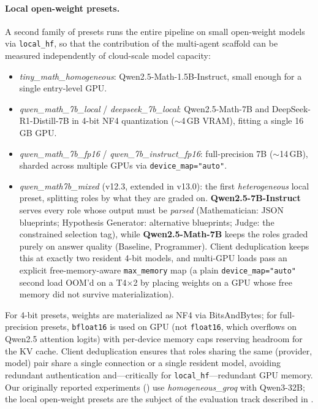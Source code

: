 \documentclass[11pt,a4paper]{article}
\begin{document}
\paragraph{Local open-weight presets.}
A second family of presets runs the entire pipeline on small open-weight models via \texttt{local\_hf}, so that the contribution of the multi-agent scaffold can be measured independently of cloud-scale model capacity:
\begin{itemize}[leftmargin=*,itemsep=1pt]
    \item \textit{tiny\_math\_homogeneous}: Qwen2.5-Math-1.5B-Instruct, small enough for a single entry-level GPU.
    \item \textit{qwen\_math\_7b\_local} / \textit{deepseek\_7b\_local}: Qwen2.5-Math-7B and DeepSeek-R1-Distill-7B in 4-bit NF4 quantization ($\sim$4\,GB VRAM), fitting a single 16\,GB GPU.
    \item \textit{qwen\_math\_7b\_fp16} / \textit{qwen\_7b\_instruct\_fp16}: full-precision 7B ($\sim$14\,GB), sharded across multiple GPUs via \texttt{device\_map="auto"}.
    \item \textit{qwen\_math7b\_mixed} (v12.3, extended in v13.0): the first \emph{heterogeneous} local preset, splitting roles by what they are graded on. \textbf{Qwen2.5-7B-Instruct} serves every role whose output must be \emph{parsed} (Mathematician: JSON blueprints; Hypothesis Generator: alternative blueprints; Judge: the constrained selection tag), while \textbf{Qwen2.5-Math-7B} keeps the roles graded purely on answer quality (Baseline, Programmer). Client deduplication keeps this at exactly two resident 4-bit models, and multi-GPU loads pass an explicit free-memory-aware \texttt{max\_memory} map (a plain \texttt{device\_map="auto"} second load OOM'd on a T4$\times$2 by placing weights on a GPU whose free memory did not survive materialization).
\end{itemize}
For 4-bit presets, weights are materialized as NF4 via BitsAndBytes; for full-precision presets, \texttt{bfloat16} is used on GPU (not \texttt{float16}, which overflows on Qwen2.5 attention logits) with per-device memory caps reserving headroom for the KV cache.
Client deduplication ensures that roles sharing the same (provider, model) pair share a single connection or a single resident model, avoiding redundant authentication and---critically for \texttt{local\_hf}---redundant GPU memory.
Our originally reported experiments () use \textit{homogeneous\_groq} with Qwen3-32B; the local open-weight presets are the subject of the evaluation track described in .
\end{document}
